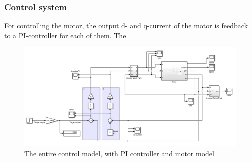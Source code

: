 

\subsubsection{Control system}
\label{sec:control_system}

For controlling the motor, the output d- and q-current of the motor is feedback to a PI-controller for each of them. The 

\begin{figure}[H]
	\centering
	\includegraphics[width=1\linewidth]{pictures/control/full_model.PNG}
	\caption{The entire control model, with PI controller and motor model}
	\label{fig:control_system}
\end{figure}